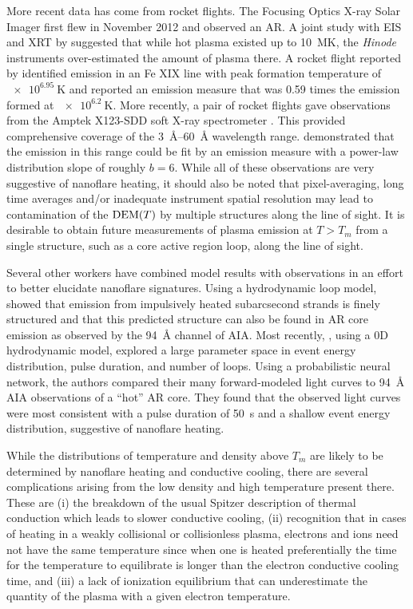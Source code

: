 More recent data has come from rocket flights. The Focusing Optics X-ray Solar Imager \citep[FOXSI,][]{krucker_focusing_2013} first flew in November 2012 and observed an AR. A joint study with EIS and XRT by \citet{ishikawa_constraining_2014} suggested that while hot plasma existed up to \SI{10}{\mega\kelvin}, the \textit{Hinode} instruments over-estimated the amount of plasma there. A rocket flight reported by \citet{brosius_pervasive_2014} identified emission in an Fe XIX line with peak formation temperature of $\SI{e6.95}{\kelvin}$ and reported an emission measure that was 0.59 times the emission formed at $\SI{e6.2}{\kelvin}$. More recently, a pair of rocket flights gave observations from the Amptek X123-SDD soft X-ray spectrometer \citep{caspi_new_2015}. This provided comprehensive coverage of the \SIrange{3}{60}{\angstrom} wavelength range. \citeauthor{caspi_new_2015} demonstrated that the emission in this range could be fit by an emission measure with a power-law distribution slope of roughly $b = 6$. While all of these observations are very suggestive of nanoflare heating, it should also be noted that pixel-averaging, long time averages and/or inadequate instrument spatial resolution may lead to contamination of the $\dem[T]$ by multiple structures along the line of sight. It is desirable to obtain future measurements of plasma emission at $T>T_m$ from a single structure, such as a core active region loop, along the line of sight.

Several other workers have combined model results with observations in an effort to better elucidate nanoflare signatures. Using a hydrodynamic loop model, \citet{reale_solar_2011} showed that emission from impulsively heated subarcsecond strands is finely structured and that this predicted structure can also be found in AR core emission as observed by the \SI{94}{\angstrom} channel of AIA. Most recently, \citet{tajfirouze_time-resolved_2016}, using a 0D hydrodynamic model, explored a large parameter space in event energy distribution, pulse duration, and number of loops. Using a probabilistic neural network, the authors compared their many forward-modeled light curves to  \SI{94}{\angstrom} AIA observations of a ``hot'' AR core. They found that the observed light curves were most consistent with a pulse duration of \SI{50}{\second} and a shallow event energy distribution, suggestive of nanoflare heating.

While the distributions of temperature and density above $T_m$ are likely to be determined by nanoflare heating and conductive cooling, there are several complications arising from the low density and high temperature present there. These are (i) the breakdown of the usual Spitzer description of thermal conduction which leads to slower conductive cooling, (ii) recognition that in cases of heating in a weakly collisional or collisionless plasma, electrons and ions need not have the same temperature since when one is heated preferentially the time for the temperature to equilibrate is longer than the electron conductive cooling time, and (iii) a lack of ionization equilibrium that can underestimate the quantity of the plasma with a given electron temperature.

